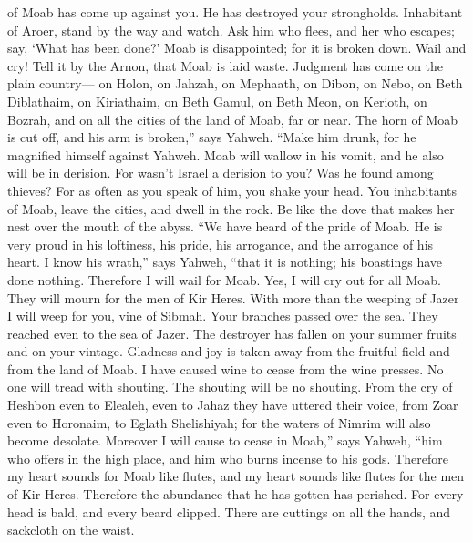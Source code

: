of Moab has come up against you. He has destroyed your strongholds.
 Inhabitant of Aroer, stand by the way and watch. Ask him
who flees, and her who escapes; say, `What has been done?'
 Moab is disappointed; for it is broken down. Wail and
cry! Tell it by the Arnon, that Moab is laid waste. 
Judgment has come on the plain country--- on Holon, on Jahzah, on
Mephaath,  on Dibon, on Nebo, on Beth Diblathaim,
 on Kiriathaim, on Beth Gamul, on Beth Meon,
 on Kerioth, on Bozrah, and on all the cities of the land
of Moab, far or near.  The horn of Moab is cut off, and
his arm is broken,'' says Yahweh.  ``Make him drunk, for
he magnified himself against Yahweh. Moab will wallow in his vomit, and
he also will be in derision.  For wasn't Israel a
derision to you? Was he found among thieves? For as often as you speak
of him, you shake your head.  You inhabitants of Moab,
leave the cities, and dwell in the rock. Be like the dove that makes her
nest over the mouth of the abyss.  ``We have heard of the
pride of Moab. He is very proud in his loftiness, his pride, his
arrogance, and the arrogance of his heart.  I know his
wrath,'' says Yahweh, ``that it is nothing; his boastings have done
nothing.  Therefore I will wail for Moab. Yes, I will cry
out for all Moab. They will mourn for the men of Kir Heres.
 With more than the weeping of Jazer I will weep for you,
vine of Sibmah. Your branches passed over the sea. They reached even to
the sea of Jazer. The destroyer has fallen on your summer fruits and on
your vintage.  Gladness and joy is taken away from the
fruitful field and from the land of Moab. I have caused wine to cease
from the wine presses. No one will tread with shouting. The shouting
will be no shouting.  From the cry of Heshbon even to
Elealeh, even to Jahaz they have uttered their voice, from Zoar even to
Horonaim, to Eglath Shelishiyah; for the waters of Nimrim will also
become desolate.  Moreover I will cause to cease in
Moab,'' says Yahweh, ``him who offers in the high place, and him who
burns incense to his gods.  Therefore my heart sounds for
Moab like flutes, and my heart sounds like flutes for the men of Kir
Heres. Therefore the abundance that he has gotten has perished.
 For every head is bald, and every beard clipped. There
are cuttings on all the hands, and sackcloth on the waist.
